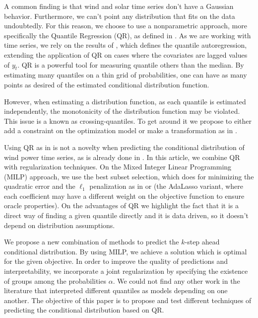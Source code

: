 A common finding is that wind and solar time series don't have a Gaussian behavior. Furthermore, we can't point any distribution that fits on the data undoubtedly. For this reason, we choose to use a nonparametric approach, more specifically the Quantile Regression (QR), as defined in \cite{koenker2005quantile}.
As we are working with time series, we rely on the results of \cite{koenker_quantile_2006}, which defines the quantile autoregression, extending the application of QR on cases where the covariates are lagged values of $y_t$. 
QR is a powerful tool for measuring quantile others than the median. By estimating many quantiles on a thin grid of probabilities, one can have as many points as desired of the estimated conditional distribution function.

However, when estimating a distribution function, as each quantile is estimated independently, the monotonicity of the distribution function may be violated. This issue is a known as crossing-quantiles. To get around it we propose to either add a constraint on the optimization model or make a transformation as in \cite{chernozhukov_quantile_2010}.

Using QR as in \cite{koenker2005quantile} is not a novelty when predicting the conditional distribution of wind power time series, as is already done in \cite{moller_time-adaptive_2008,nielsen2006,bremnes_probabilistic_2004,wan_direct_2017}.
In this article, we combine QR with regularization techniques. On the Mixed Integer Linear Programming (MILP) approach, we use the best subset selection, which \cite{bertsimas_best_2015} does for minimizing the quadratic error and the $\ell_1$ penalization as in \cite{belloni_l1-penalized_2009} or \cite{ciuperca_adaptive_2016} (the AdaLasso variant, where each coefficient may have a different weight on the objective function to ensure oracle properties).
On the advantages of QR we highlight the fact that it is a direct way of finding a given quantile directly and it is data driven, so it doesn't depend on distribution assumptions. 




We propose a new combination of methods to predict the $k$-step ahead conditional distribution. By using MILP, we achieve a solution which is optimal for the given objective. In order to improve the quality of predictions and interpretability, we incorporate a joint regularization by specifying the existence of groups among the probabilities $\alpha$. We could not find any other work in the literature that interpreted different quantiles as models depending on one another. 
The objective of this paper is to propose and test different techniques of predicting the conditional distribution based on QR. 


